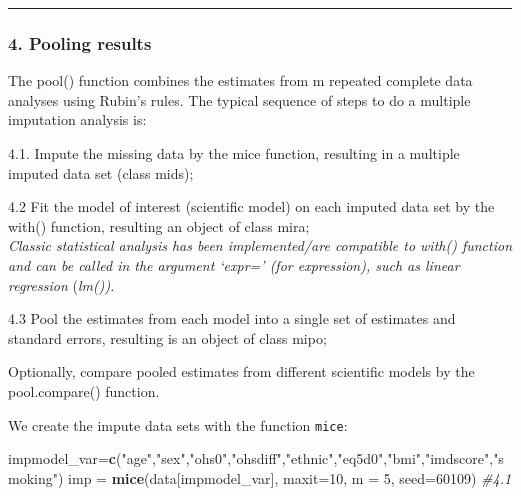 \documentclass[
]{article}
\newenvironment{Shaded}{\begin{snugshade}}{\end{snugshade}}
\newcommand{\AttributeTok}[1]{\textcolor[rgb]{0.13,0.29,0.53}{#1}}
\newcommand{\CommentTok}[1]{\textcolor[rgb]{0.56,0.35,0.01}{\textit{#1}}}
\newcommand{\DecValTok}[1]{\textcolor[rgb]{0.00,0.00,0.81}{#1}}
\newcommand{\FunctionTok}[1]{\textcolor[rgb]{0.13,0.29,0.53}{\textbf{#1}}}
\newcommand{\NormalTok}[1]{#1}
\newcommand{\OtherTok}[1]{\textcolor[rgb]{0.56,0.35,0.01}{#1}}
\newcommand{\StringTok}[1]{\textcolor[rgb]{0.31,0.60,0.02}{#1}}
\begin{document}
\begin{center}\rule{0.5\linewidth}{0.5pt}\end{center}

\hypertarget{pooling-results}{%
\subsubsection{4. Pooling results}\label{pooling-results}}

The pool() function combines the estimates from m repeated complete data
analyses using Rubin's rules. The typical sequence of steps to do a
multiple imputation analysis is:

4.1. Impute the missing data by the mice function, resulting in a
multiple imputed data set (class mids);

4.2 Fit the model of interest (scientific model) on each imputed data
set by the with() function, resulting an object of class mira;\\
\emph{Classic statistical analysis has been implemented/are compatible
to with() function and can be called in the argument `expr=' (for
expression), such as linear regression} (\emph{lm()).}

4.3 Pool the estimates from each model into a single set of estimates
and standard errors, resulting is an object of class mipo;

Optionally, compare pooled estimates from different scientific models by
the pool.compare() function.

We create the impute data sets with the function \texttt{mice}:

\begin{Shaded}
\begin{Highlighting}[]
\NormalTok{impmodel\_var}\OtherTok{=}\FunctionTok{c}\NormalTok{(}\StringTok{"age"}\NormalTok{,}\StringTok{"sex"}\NormalTok{,}\StringTok{"ohs0"}\NormalTok{,}\StringTok{"ohsdiff"}\NormalTok{,}\StringTok{"ethnic"}\NormalTok{,}\StringTok{"eq5d0"}\NormalTok{,}\StringTok{"bmi"}\NormalTok{,}\StringTok{"imdscore"}\NormalTok{,}\StringTok{"smoking"}\NormalTok{)}
\NormalTok{imp }\OtherTok{=} \FunctionTok{mice}\NormalTok{(data[impmodel\_var], }\AttributeTok{maxit=}\DecValTok{10}\NormalTok{, }\AttributeTok{m =} \DecValTok{5}\NormalTok{, }\AttributeTok{seed=}\DecValTok{60109}\NormalTok{)  }\CommentTok{\#4.1}
\end{Highlighting}
\end{Shaded}
\end{document}
